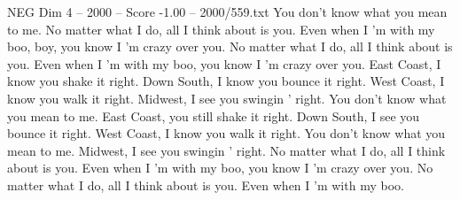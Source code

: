 \begin{textsample}{NEG Dim 4 – 2000 – Score -1.00 – 2000/559.txt}
You don't know what you mean to me.
No matter what I do, all I think about is you.
Even when I 'm with my boo, boy, you know I 'm crazy over you.
No matter what I do, all I think about is you.
Even when I 'm with my boo, you know I 'm crazy over you.
East Coast, I know you shake it right.
Down South, I know you bounce it right.
West Coast, I know you walk it right.
Midwest, I see you swingin ' right.
You don't know what you mean to me.
East Coast, you still shake it right.
Down South, I see you bounce it right.
West Coast, I know you walk it right.
You don't know what you mean to me.
Midwest, I see you swingin ' right.
No matter what I do, all I think about is you.
Even when I 'm with my boo, you know I 'm crazy over you.
No matter what I do, all I think about is you.
Even when I 'm with my boo.

\end{textsample}
